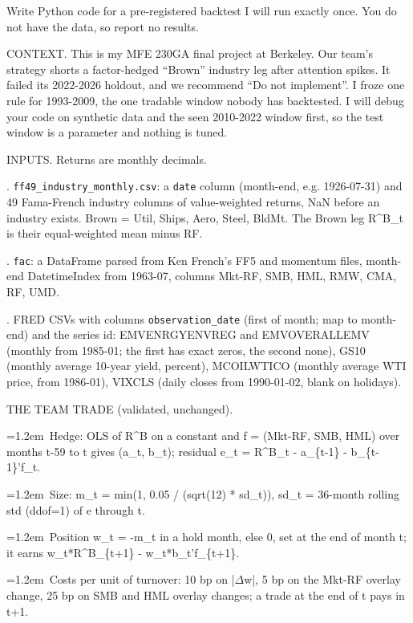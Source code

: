 \par\noindent Write Python code for a pre-registered backtest I will run exactly once. You do not have the data, so report no results.
\medskip
\par\noindent CONTEXT. This is my MFE 230GA final project at Berkeley. Our team's strategy shorts a factor-hedged ``Brown'' industry leg after attention spikes. It failed its 2022-2026 holdout, and we recommend ``Do not implement''. I froze one rule for 1993-2009, the one tradable window nobody has backtested. I will debug your code on synthetic data and the seen 2010-2022 window first, so the test window is a parameter and nothing is tuned.
\medskip
\par\noindent INPUTS. Returns are monthly decimals.
\par{}. \texttt{ff49\_industry\_monthly.csv}: a \texttt{date} column (month-end, e.g. 1926-07-31) and 49 Fama-French industry columns of value-weighted returns, NaN before an industry exists. Brown = Util, Ships, Aero, Steel, BldMt. The Brown leg R\^{}B\_t is their equal-weighted mean minus RF.
\par{}. \texttt{fac}: a DataFrame parsed from Ken French's FF5 and momentum files, month-end DatetimeIndex from 1963-07, columns Mkt-RF, SMB, HML, RMW, CMA, RF, UMD.
\par{}. FRED CSVs with columns \texttt{observation\_date} (first of month; map to month-end) and the series id: EMVENRGYENVREG and EMVOVERALLEMV (monthly from 1985-01; the first has exact zeros, the second none), GS10 (monthly average 10-year yield, percent), MCOILWTICO (monthly average WTI price, from 1986-01), VIXCLS (daily closes from 1990-01-02, blank on holidays).
\medskip
\par\noindent THE TEAM TRADE (validated, unchanged).
\par\hangindent=1.2em\noindent\textbullet~Hedge: OLS of R\^{}B on a constant and f = (Mkt-RF, SMB, HML) over months t-59 to t gives (a\_t, b\_t); residual e\_t = R\^{}B\_t - a\_\{t-1\} - b\_\{t-1\}'f\_t.
\par\hangindent=1.2em\noindent\textbullet~Size: m\_t = min(1, 0.05 / (sqrt(12) * sd\_t)), sd\_t = 36-month rolling std (ddof=1) of e through t.
\par\hangindent=1.2em\noindent\textbullet~Position w\_t = -m\_t in a hold month, else 0, set at the end of month t; it earns w\_t*R\^{}B\_\{t+1\} - w\_t*b\_t'f\_\{t+1\}.
\par\hangindent=1.2em\noindent\textbullet~Costs per unit of turnover: 10 bp on |$\Delta$w|, 5 bp on the Mkt-RF overlay change, 25 bp on SMB and HML overlay changes; a trade at the end of t pays in t+1.
